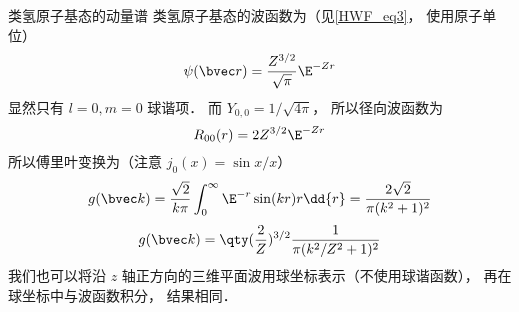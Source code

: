 \begin{example}{类氢原子基态的动量谱}\label{Pl2Ylm_ex1}
类氢原子基态的波函数为（见\autoref{HWF_eq3}， 使用原子单位）
\begin{equation}
\psi(\bvec r) = \frac{Z^{3/2}}{\sqrt\pi} \E^{-Zr}
\end{equation}
显然只有 $l = 0, m = 0$ 球谐项． 而 $Y_{0,0} = 1/\sqrt{4\pi}$， 所以径向波函数为
\begin{equation}
R_{00}(r) = 2 Z^{3/2} \E^{-Zr}
\end{equation}
所以傅里叶变换为（注意 $j_0(x) = \sin x/x$）
\begin{equation}
g(\bvec k) = \frac{\sqrt{2}}{k\pi} \int_0^\infty \E^{-r} \sin(kr) r \dd{r} = \frac{2\sqrt{2}}{\pi(k^2+1)^2}
\end{equation}
\begin{equation}
g(\bvec k) = \qty(\frac{2}{Z})^{3/2} \frac{1}{\pi(k^2/Z^2 + 1)^2}
\end{equation}
我们也可以将沿 $z$ 轴正方向的三维平面波用球坐标表示（不使用球谐函数）， 再在球坐标中与波函数积分， 结果相同．
\end{example}
